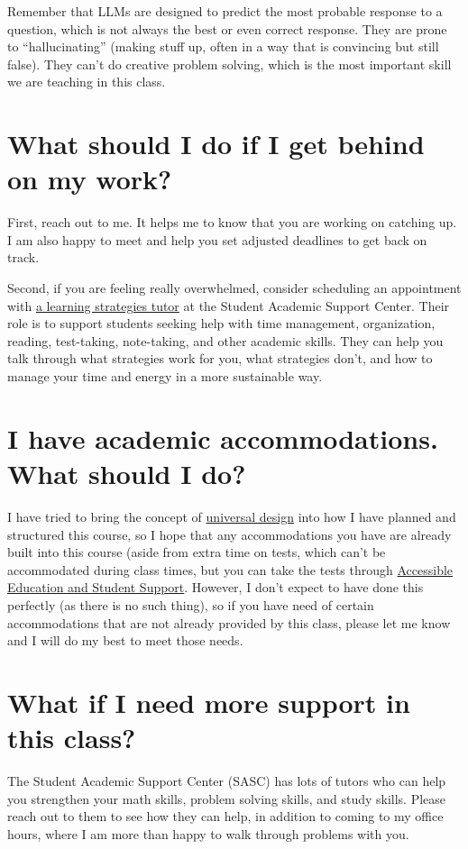 \documentclass[
  letterpaper,
  DIV=11,
  numbers=noendperiod]{scrartcl}
\begin{document}
Remember that LLMs are designed to predict the most probable response to
a question, which is not always the best or even correct response. They
are prone to ``hallucinating'' (making stuff up, often in a way that is
convincing but still false). They can't do creative problem solving,
which is the most important skill we are teaching in this class.

\section{What should I do if I get behind on my work?}\label{catchingup}

First, reach out to me. It helps me to know that you are working on
catching up. I am also happy to meet and help you set adjusted deadlines
to get back on track.

Second, if you are feeling really overwhelmed, consider scheduling an
appointment with
\href{https://www.bates.edu/student-academic-support-center/learning-strategies/}{a
learning strategies tutor} at the Student Academic Support Center. Their
role is to support students seeking help with time management,
organization, reading, test-taking, note-taking, and other academic
skills. They can help you talk through what strategies work for you,
what strategies don't, and how to manage your time and energy in a more
sustainable way.

\section{I have academic accommodations. What should I
do?}\label{accommodations}

I have tried to bring the concept of
\href{https://www.washington.edu/doit/what-universal-design-0}{universal
design} into how I have planned and structured this course, so I hope
that any accommodations you have are already built into this course
(aside from extra time on tests, which can't be accommodated during
class times, but you can take the tests through
\href{https://www.bates.edu/accessible-education-student-support/requesting-services/how-to-register-for-accommodations/}{Accessible
Education and Student Support}. However, I don't expect to have done
this perfectly (as there is no such thing), so if you have need of
certain accommodations that are not already provided by this class,
please let me know and I will do my best to meet those needs.

\section{What if I need more support in this class?}\label{extrahelp}

The Student Academic Support Center (SASC) has lots of tutors who can
help you strengthen your math skills, problem solving skills, and study
skills. Please reach out to them to see how they can help, in addition
to coming to my office hours, where I am more than happy to walk through
problems with you.
\end{document}

